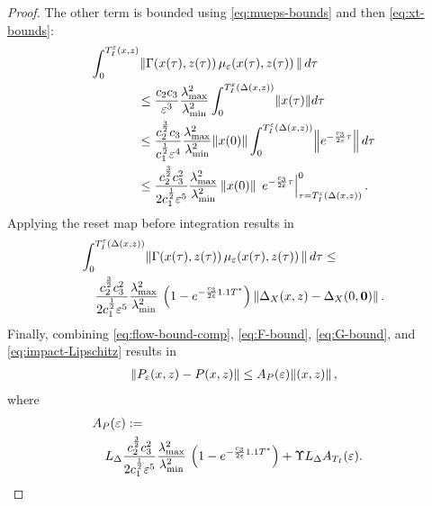 \documentclass[twocolumn]{article}
\begin{document}
\begin{proof}
  The other term is bounded using \eqref{eq:mueps-bounds} and then \eqref{eq:xt-bounds}:
  \begin{align}
    \nonumber
    \int_{0}^{T_{I}^{\varepsilon}(x, z)} \! &\left\| \Gamma(x(\tau), z(\tau)) \, \mu_{\varepsilon}(x(\tau), z(\tau)) \, \right\| d\tau\\
    \nonumber
    &\leq \frac{c_{2}c_{3}}{\varepsilon^{3}} \frac{\lambda_{\mathrm{max}}^{2}}{\lambda_{\mathrm{min}}^{2}} \int_{0}^{T_{I}^{\varepsilon}(\Delta(x, z))} \! \|x(\tau)\| d\tau\\
    \nonumber
    &\leq \frac{c_{2}^{\frac{3}{2}}c_{3}}{c_{1}^{\frac{1}{2}}\varepsilon^{4}} \frac{\lambda_{\mathrm{max}}^{2}}{\lambda_{\mathrm{min}}^{2}} \|x(0)\| \int_{0}^{T_{I}^{\varepsilon}(\Delta(x, z))} \! \left\|e^{-\frac{c_{3}}{2\varepsilon} \tau} \right\| d\tau\\
    \label{eq:G-bound}
    &\leq \frac{c_{2}^{\frac{3}{2}} c_{3}^{2}}{2c_{1}^{\frac{1}{2}}\varepsilon^{5}} \frac{\lambda_{\mathrm{max}}^{2}}{\lambda_{\mathrm{min}}^{2}} \left\|x(0)\right\| \, \left. e^{-\frac{c_{3}}{2\varepsilon} \tau} \right|^{0}_{\tau=T_{I}^{\varepsilon}(\Delta(x, z))}.
  \end{align}
  Applying the reset map before integration results in
  \begin{align}
    \label{eq:flow-bound-foo-1}
    \lefteqn{\int_{0}^{\TIeDelta} \! \left\| \bigG\argsxztau \, \mueps\argsxztau \, \right\| d\tau \leq}\\
    \nonumber
    &&\frac{c_{2}^{\frac{3}{2}} c_{3}^{2}}{2c_{1}^{\frac{1}{2}}\resclfparam^{5}} \frac{\lambdamaxG^{2}}{\lambdaminG^{2}}  \, \left(1 - e^{-\frac{c_{3}}{2\resclfparam} 1.1 \Tst}\right) \left\|\DeltaX\argsxz - \DeltaX\argszero\right\|.
  \end{align}
  Finally, combining \eqref{eq:flow-bound-comp}, \eqref{eq:F-bound}, \eqref{eq:G-bound}, and \eqref{eq:impact-Lipschitz} results in
  \begin{align}
    \left\| P_{\varepsilon}(x, z) - P(x, z) \right\| \leq A_{P}(\varepsilon) \! \left\|(x, z)\right\|,
  \end{align}
  where
  \begin{align}
    \lefteqn{\Ae :=} \\
    \nonumber
    &&\LDelta \frac{c_{2}^{\frac{3}{2}} c_{3}^{2}}{2c_{1}^{\frac{1}{2}}\resclfparam^{5}} \frac{\lambdamaxG^{2}}{\lambdaminG^{2}}  \, \left(1 - e^{-\frac{c_{3}}{2\resclfparam} 1.1 \Tst}\right) + \supF \LDelta \ATIe. &\qedhere
  \end{align}
\end{proof}
\end{document}
